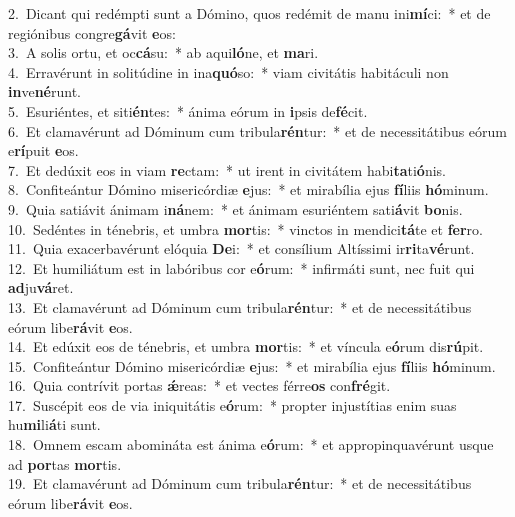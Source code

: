 {2.~}Dicant qui redémpti sunt a Dómino, quos redémit de manu ini\textbf{mí}ci:~* et de regiónibus congre\textbf{gá}vit \textbf{e}os:\\
{3.~}A solis ortu, et oc\textbf{cá}su:~* ab aqui\textbf{ló}ne, et \textbf{ma}ri.\\
{4.~}Erravérunt in solitúdine in ina\textbf{quó}so:~* viam civitátis habitáculi non \textbf{in}ve\textbf{né}runt.\\
{5.~}Esuriéntes, et siti\textbf{én}tes:~* ánima eórum in \textbf{i}psis de\textbf{fé}cit.\\
{6.~}Et clamavérunt ad Dóminum cum tribula\textbf{rén}tur:~* et de necessitátibus eórum e\textbf{rí}puit \textbf{e}os.\\
{7.~}Et dedúxit eos in viam \textbf{re}ctam:~* ut irent in civitátem habi\textbf{ta}ti\textbf{ó}nis.\\
{8.~}Confiteántur Dómino misericórdiæ \textbf{e}jus:~* et mirabília ejus \textbf{fí}liis \textbf{hó}minum.\\
{9.~}Quia satiávit ánimam i\textbf{ná}nem:~* et ánimam esuriéntem sati\textbf{á}vit \textbf{bo}nis.\\
{10.~}Sedéntes in ténebris, et umbra \textbf{mor}tis:~* vinctos in mendici\textbf{tá}te et \textbf{fer}ro.\\
{11.~}Quia exacerbavérunt elóquia \textbf{De}i:~* et consílium Altíssimi ir\textbf{ri}ta\textbf{vé}runt.\\
{12.~}Et humiliátum est in labóribus cor e\textbf{ó}rum:~* infirmáti sunt, nec fuit qui \textbf{ad}ju\textbf{vá}ret.\\
{13.~}Et clamavérunt ad Dóminum cum tribula\textbf{rén}tur:~* et de necessitátibus eórum libe\textbf{rá}vit \textbf{e}os.\\
{14.~}Et edúxit eos de ténebris, et umbra \textbf{mor}tis:~* et víncula e\textbf{ó}rum dis\textbf{rú}pit.\\
{15.~}Confiteántur Dómino misericórdiæ \textbf{e}jus:~* et mirabília ejus \textbf{fí}liis \textbf{hó}minum.\\
{16.~}Quia contrívit portas \textbf{ǽ}reas:~* et vectes férre\textbf{os} con\textbf{fré}git.\\
{17.~}Suscépit eos de via iniquitátis e\textbf{ó}rum:~* propter injustítias enim suas hu\textbf{mi}li\textbf{á}ti sunt.\\
{18.~}Omnem escam abomináta est ánima e\textbf{ó}rum:~* et appropinquavérunt usque ad \textbf{por}tas \textbf{mor}tis.\\
{19.~}Et clamavérunt ad Dóminum cum tribula\textbf{rén}tur:~* et de necessitátibus eórum libe\textbf{rá}vit \textbf{e}os.\\
